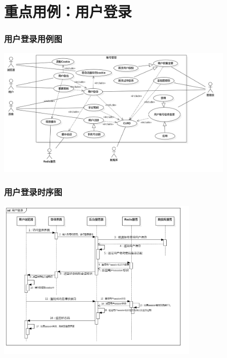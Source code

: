 \section{重点用例：用户登录}
\begin{frame}
    \frametitle{用户登录用例图}
    \center
    \includegraphics[width=4.5in]{contents/figure/login_usecase_diagram.png}
\end{frame}
\begin{frame}
    \frametitle{用户登录时序图}
    \center
    \includegraphics[width=3.8in]{contents/figure/login_sequence_diagram.png}
\end{frame}
